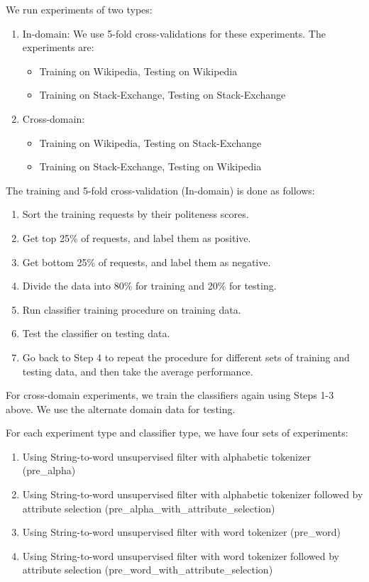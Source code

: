 \documentclass[conference]{IEEEtran}
\begin{document}
We run experiments of two types:
\begin{enumerate}
\item In-domain:
    We use 5-fold cross-validations for these experiments. The experiments are:
    \begin{itemize}
    \item Training on Wikipedia, Testing on Wikipedia
    \item Training on Stack-Exchange, Testing on Stack-Exchange
    \end{itemize}

\item Cross-domain:
    \begin{itemize}
    \item Training on Wikipedia, Testing on Stack-Exchange
    \item Training on Stack-Exchange, Testing on Wikipedia
    \end{itemize}
\end{enumerate}

The training and 5-fold cross-validation (In-domain) is done as follows:
\begin{enumerate}
\item Sort the training requests by their politeness scores.
\item Get top 25\% of requests, and label them as positive.
\item Get bottom 25\% of requests, and label them as negative.
\item Divide the data into 80\% for training and 20\% for testing.
\item Run classifier training procedure on training data.
\item Test the classifier on testing data.
\item Go back to Step 4 to repeat the procedure for different sets of training and testing data, and then take the average performance.
\end{enumerate}

For cross-domain experiments, we train the classifiers again using Steps 1-3 above. We use the alternate domain data for testing.

For each experiment type and classifier type, we have four sets of experiments:
\begin{enumerate}
\item Using String-to-word unsupervised filter with alphabetic tokenizer (pre\_alpha)
\item Using String-to-word unsupervised filter with alphabetic tokenizer followed by attribute selection (pre\_alpha\_with\_attribute\_selection)
\item Using String-to-word unsupervised filter with word tokenizer (pre\_word)
\item Using String-to-word unsupervised filter with word tokenizer followed by attribute selection (pre\_word\_with\_attribute\_selection)
\end{enumerate}
\end{document}
